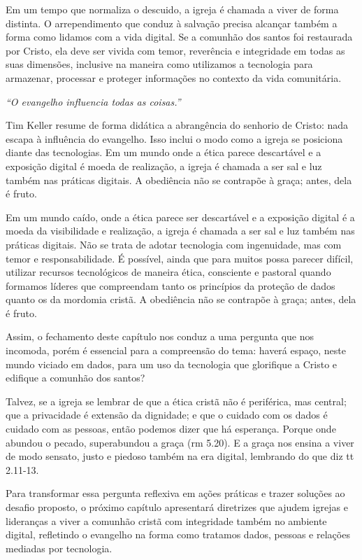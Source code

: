 Em um tempo que normaliza o descuido, a igreja é chamada a viver de forma distinta. O arrependimento que conduz à salvação precisa alcançar também a forma como lidamos com a vida digital. Se a comunhão dos santos foi restaurada por Cristo, ela deve ser vivida com temor, reverência e integridade em todas as suas dimensões, inclusive na maneira como utilizamos a tecnologia para armazenar, processar e proteger informações no contexto da vida comunitária.

\textit{``O evangelho influencia todas as coisas.''} \cite[p.~56]{keller2014}

Tim Keller resume de forma didática a abrangência do senhorio de Cristo: nada escapa à influência do evangelho. Isso inclui o modo como a igreja se posiciona diante das tecnologias. Em um mundo onde a ética parece descartável e a exposição digital é moeda de realização, a igreja é chamada a ser sal e luz também nas práticas digitais. A obediência não se contrapõe à graça; antes, dela é fruto.

Em um mundo caído, onde a ética parece ser descartável e a exposição digital é a moeda da visibilidade e realização, a igreja é chamada a ser sal e luz também nas práticas digitais. Não se trata de adotar tecnologia com ingenuidade, mas com temor e responsabilidade. É possível, ainda que para muitos possa parecer difícil, utilizar recursos tecnológicos de maneira ética, consciente e pastoral quando formamos líderes que compreendam tanto os princípios da proteção de dados quanto os da mordomia cristã. A obediência não se contrapõe à graça; antes, dela é fruto.

Assim, o fechamento deste capítulo nos conduz a uma pergunta que nos incomoda, porém é essencial para a compreensão do tema: haverá espaço, neste mundo viciado em dados, para um uso da tecnologia que glorifique a Cristo e edifique a comunhão dos santos?

Talvez, se a igreja se lembrar de que a ética cristã não é periférica, mas central; que a privacidade é extensão da dignidade; e que o cuidado com os dados é cuidado com as pessoas, então podemos dizer que há esperança. Porque onde abundou o pecado, superabundou a graça (\gls{rm} 5.20). E a graça nos ensina a viver de modo sensato, justo e piedoso também na era digital, lembrando do que diz \gls{tt} 2.11-13.

Para transformar essa pergunta reflexiva em ações práticas e trazer soluções ao desafio proposto, o próximo capítulo apresentará diretrizes que ajudem igrejas e lideranças a viver a comunhão cristã com integridade também no ambiente digital, refletindo o evangelho na forma como tratamos dados, pessoas e relações mediadas por tecnologia.